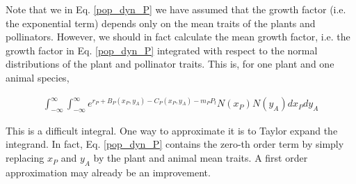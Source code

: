 \documentclass[a4paper,12pt]{article}
\begin{document}
Note that we in Eq. \ref{pop_dyn_P} we have assumed that the growth factor (i.e. the exponential term) depends only on the mean traits of the plants and pollinators. However, we should in fact calculate the mean growth factor, i.e. the growth factor in Eq. \ref{pop_dyn_P} integrated with respect to the normal distributions of the plant and pollinator traits. This is, for one plant and one animal species,

\begin{align}
\int^\infty_{-\infty} \int^\infty_{-\infty} e^{r_{P} + B_{P}(x_P,y_A) - C_{P}(x_P,y_A) - m_{P} P_{t}} N(x_P) N(y_A) dx_P dy_A   
\end{align}

This is a difficult integral. One way to approximate it is to Taylor expand the integrand. In fact, Eq. \ref{pop_dyn_P} contains the zero-th order term by simply replacing $x_P$ and $y_A$ by the plant and animal mean traits. A first order approximation may already be an improvement.
\end{document}
